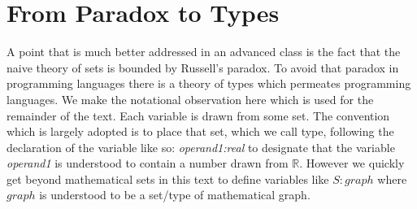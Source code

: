 \section{From Paradox to Types}
A point that is much better addressed in an advanced class is the fact that the naive theory of sets is bounded by Russell's paradox. To avoid that paradox in programming languages there is a theory of types which permeates programming languages. We make the notational observation here which is used for the remainder of the text. Each variable is drawn from some set. The convention which is largely adopted is to place that set, which we call type, following the declaration of the variable like so: \textit{operand1:real} to designate that the variable \textit{operand1} is understood to contain a number drawn from $\mathbb{R}$. However we quickly get beyond mathematical sets in this text to define variables like $S:graph$ where $graph$ is understood to be a set/type of mathematical graph. 

\newpage
